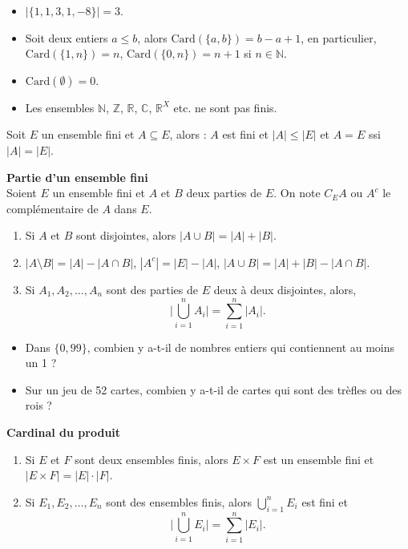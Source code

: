 \documentclass[../PolyS4.tex]{subfiles}
\begin{document}
\begin{Ex}
\begin{itemize}
    \item $| \{1, 1, 3, 1, -8\} | = 3$.
    \item Soit deux entiers $a \leq b$, alors $\mathrm{Card}(\{a, b\}) = b - a + 1$, en particulier, $\mathrm{Card}(\{1, n\}) = n$, $\mathrm{Card}(\{0, n\}) = n + 1$ si $n \in \mathbb{N}$.
    \item $\mathrm{Card}(\emptyset) = 0$.
    \item Les ensembles $\mathbb{N}$, $\mathbb{Z}$, $\mathbb{R}$, $\mathbb{C}$, $\mathbb{R}^X$ etc. ne sont pas finis.\\
\end{itemize}
\end{Ex}
\begin{Def}
Soit $E$ un ensemble fini et $A \subseteq E$, alors : $A$ est fini et $|A| \leq |E|$ et $A = E$ ssi $|A| = |E|$.
\end{Def}
\begin{Prop}\textbf{ Partie d'un ensemble fini}\\
Soient $E$ un ensemble fini et $A$ et $B$ deux parties de $E$. On note $C_{E}A$ ou $A^c$ le complémentaire de $A$ dans $E$.
\begin{enumerate}
    \item Si $A$ et $B$ sont disjointes, alors $|A \cup B| = |A| + |B|$.
    \item $|A \setminus B| = |A| - |A \cap B|$, $|A^c| = |E| - |A|$, $|A \cup B| = |A| + |B| - |A \cap B|$.
    \item Si $A_1, A_2, \ldots, A_n$ sont des parties de $E$ deux à deux disjointes, alors,
    \[
    \bigg| \bigcup_{i=1}^n A_i \bigg| = \sum_{i=1}^n |A_i|.
    \]
\end{enumerate}
\end{Prop}


\begin{Ex}
\begin{itemize}
    \item Dans $\{0, 99\}$, combien y a-t-il de nombres entiers qui contiennent au moins un 1 ?
    \item Sur un jeu de 52 cartes, combien y a-t-il de cartes qui sont des trèfles ou des rois ?
\end{itemize}
\end{Ex}
\begin{Prop}\textbf{ Cardinal du produit}\\

\begin{enumerate}
    \item Si $E$ et $F$ sont deux ensembles finis, alors $E \times F$ est un ensemble fini et $|E \times F| = |E| \cdot |F|$.
    \item Si $E_1, E_2, \ldots, E_n$ sont des ensembles finis, alors $\bigcup_{i=1}^n E_i$ est fini et
    \[
    \bigg| \bigcup_{i=1}^n E_i \bigg| = \sum_{i=1}^n |E_i|.
    \]
\end{enumerate}
\end{Prop}
\end{document}
